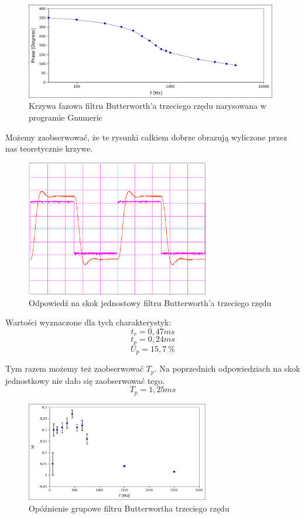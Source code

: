 \documentclass[a4paper,11pt]{article}
\begin{document}
\begin{figure}[H]
\begin{center}
\includegraphics[width=11cm]{obrazki/teo_przepis.png}
\end{center}
\caption{Krzywa fazowa filtru Butterworth'a trzeciego rzędu  narysowana w programie Gnumeric}
\end{figure}

Możemy zaobserwować, że te rysunki całkiem dobrze obrazują wyliczone przez nas teoretycznie krzywe.


\begin{figure}[H]
\begin{center}
\includegraphics[width=8cm]{obrazki/maslowilkbialy.png}
\end{center}
\caption{Odpowiedź na skok jednostowy filtru Butterworth'a trzeciego rzędu}
\end{figure}

Wartości wyznaczone dla tych charakterystyk: 
$$ t_r= 0,47 ms$$ 
$$ t_p= 0,24 ms$$ 
$$ U_p= 15,7 \  \% $$

Tym razem możemy też zaobserwować $T_p$. Na poprzednich odpowiedziach na skok jednostkowy nie dało się zaobserwować tego. 
$$ T_p= 1,25 ms$$ 


\begin{figure}[H]
\begin{center}
\includegraphics[width=8cm]{obrazki/nbw.png}
\end{center}
\caption{Opóźnienie grupowe filtru Butterwortha trzeciego rzędu}
\end{figure}
\end{document}
